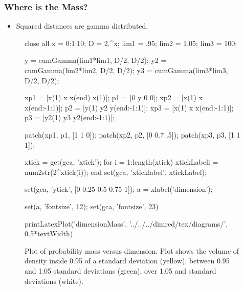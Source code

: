 \begin{frame}[fragile]
  \frametitle{Where is the Mass?}
  \begin{itemize}
  \item Squared distances are gamma distributed.
  \end{itemize}
\begin{figure}
  \begin{matlab}
    close all
    x = 0:1:10;
    D = 2.^x;
    lim1 = .95;
    lim2 = 1.05;
    lim3 = 100;

    y = cumGamma(lim1*lim1, D/2, D/2);
    y2 = cumGamma(lim2*lim2, D/2, D/2);
    y3 = cumGamma(lim3*lim3, D/2, D/2);

    xp1 = [x(1) x x(end) x(1)];
    p1 = [0 y 0 0];
    xp2 = [x(1) x x(end:-1:1)];
    p2 = [y(1) y2 y(end:-1:1)];
    xp3 = [x(1) x x(end:-1:1)];
    p3 = [y2(1) y3 y2(end:-1:1)];

    patch(xp1, p1, [1 1 0]);
    patch(xp2, p2, [0 0.7 .5]);
    patch(xp3, p3, [1 1 1]);

    xtick = get(gca, 'xtick');
    for i = 1:length(xtick)
      xtickLabel{i} =  num2str(2^xtick(i));
    end
    set(gca, 'xticklabel', xtickLabel);

    set(gca, 'ytick', [0 0.25 0.5 0.75 1]);
    a = xlabel('dimension');

    set(a, 'fontsize', 12);
    set(gca, 'fontsize', 23)

    printLatexPlot('dimensionMass', '../../../dimred/tex/diagrams/', 0.5*textWidth)

  \end{matlab}
  \begin{center}
  \end{center}

  \caption{Plot of probability mass versus dimension. Plot shows the
    volume of density inside 0.95 of a standard deviation (yellow),
    between 0.95 and 1.05 standard deviations (green), over 1.05
    and standard deviations (white).}

\end{figure}



\end{frame}

